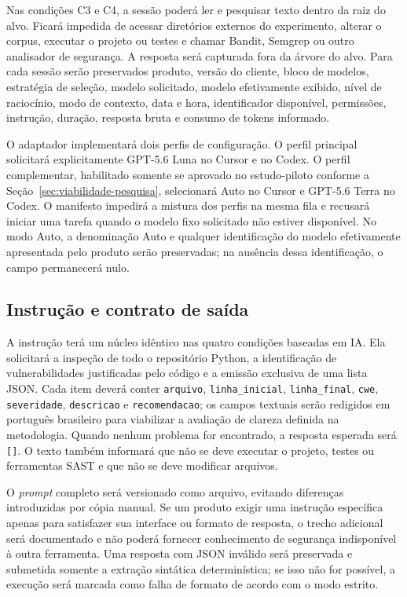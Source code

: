 Nas condições C3 e C4, a sessão poderá ler e pesquisar texto dentro da raiz do alvo. Ficará impedida de acessar diretórios externos do experimento, alterar o corpus, executar o projeto ou testes e chamar Bandit, Semgrep ou outro analisador de segurança. A resposta será capturada fora da árvore do alvo. Para cada sessão serão preservados produto, versão do cliente, bloco de modelos, estratégia de seleção, modelo solicitado, modelo efetivamente exibido, nível de raciocínio, modo de contexto, data e hora, identificador disponível, permissões, instrução, duração, resposta bruta e consumo de tokens informado.

O adaptador implementará dois perfis de configuração. O perfil principal solicitará explicitamente GPT-5.6 Luna no Cursor e no Codex. O perfil complementar, habilitado somente se aprovado no estudo-piloto conforme a Seção~\ref{sec:viabilidade-pesquisa}, selecionará Auto no Cursor e GPT-5.6 Terra no Codex. O manifesto impedirá a mistura dos perfis na mesma fila e recusará iniciar uma tarefa quando o modelo fixo solicitado não estiver disponível. No modo Auto, a denominação Auto e qualquer identificação do modelo efetivamente apresentada pelo produto serão preservadas; na ausência dessa identificação, o campo permanecerá nulo.

\subsection{Instrução e contrato de saída}\label{subsec:padronizacao-prompts}

A instrução terá um núcleo idêntico nas quatro condições baseadas em IA. Ela solicitará a inspeção de todo o repositório Python, a identificação de vulnerabilidades justificadas pelo código e a emissão exclusiva de uma lista JSON. Cada item deverá conter \texttt{arquivo}, \texttt{linha\_inicial}, \texttt{linha\_final}, \texttt{cwe}, \texttt{severidade}, \texttt{descricao} e \texttt{recomendacao}; os campos textuais serão redigidos em português brasileiro para viabilizar a avaliação de clareza definida na metodologia. Quando nenhum problema for encontrado, a resposta esperada será \texttt{[]}. O texto também informará que não se deve executar o projeto, testes ou ferramentas SAST e que não se deve modificar arquivos.

O \textit{prompt} completo será versionado como arquivo, evitando diferenças introduzidas por cópia manual. Se um produto exigir uma instrução específica apenas para satisfazer sua interface ou formato de resposta, o trecho adicional será documentado e não poderá fornecer conhecimento de segurança indisponível à outra ferramenta. Uma resposta com JSON inválido será preservada e submetida somente a extração sintática determinística; se isso não for possível, a execução será marcada como falha de formato de acordo com o modo estrito.

